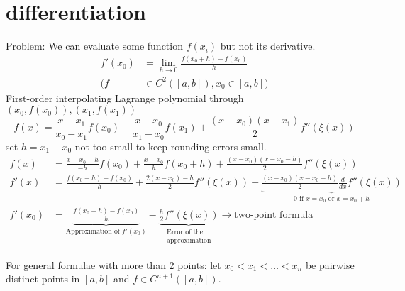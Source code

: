 \section{differentiation}\label{sec:differentiation}
Problem: We can evaluate some function $f(x_i)$ but not its derivative.
\begin{align*}
    f'(x_0) &= \lim_{h \to 0} \frac{f(x_0 + h) - f(x_0)}{h}\\
    (f &\in C^2([a,b]), x_0 \in [a,b])
\end{align*}
First-order interpolating Lagrange polynomial through $(x_0, f(x_0)), (x_1, f(x_1))$
\begin{equation*}
    f(x) = \frac{x-x_1}{x_0-x_1} f(x_0) + \frac{x-x_0}{x_1-x_0} f(x_1) + \frac{(x-x_0)(x-x_1)}{2} f''(\xi(x))
\end{equation*}
set $h= x_1 - x_0$ not too small to keep rounding errors small.
\begin{align*}
    f(x) &= \frac{x-x_0 - h}{-h} f(x_0) + \frac{x-x_0}{h} f(x_0 + h) + \frac{(x-x_0)(x-x_0-h)}{2} f''(\xi(x))\\
    f'(x) &= \frac{f(x_0 + h) - f(x_0)}{h} + \frac{2 (x-x_0) - h}{2} f''(\xi(x))
    + \underbrace{\frac{(x-x_0)(x-x_0-h)}{2} \frac{d}{dx}f''(\xi(x))}_{\text{0 if } x = x_0 \text{ or } x = x_0 + h}\\
    f'(x_0) &= \underbrace{\frac{f(x_0 + h) - f(x_0)}{h}}_{\text{Approximation of } f'(x_0)} - \underbrace{\frac{h}{2} f''(\xi(x))}_{\substack{\text{Error of the} \\ \text{approximation}}}
    \to \text{two-point formula}
\end{align*}

For general formulae with more than 2 points:
let $x_0 < x_1 < \ldots < x_n$ be pairwise distinct points in $[a,b]$ and $f \in C^{n+1}([a,b])$.

